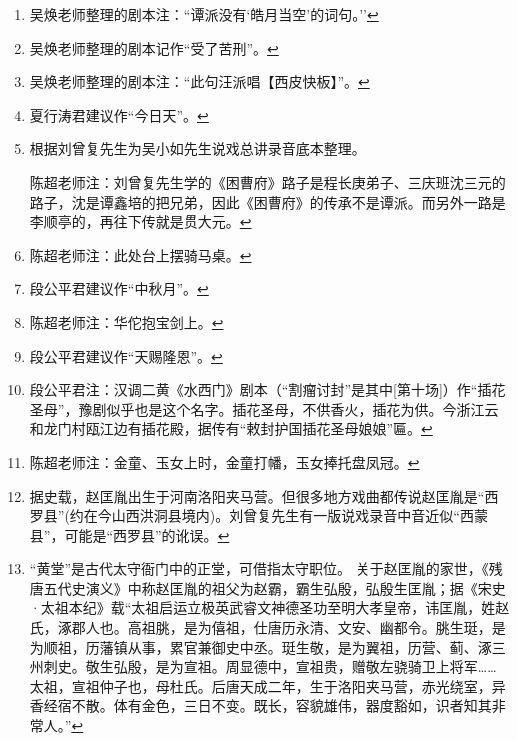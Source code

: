 \begin{enumerate}
\item
  \leavevmode\hypertarget{fn409}{}%
  吴焕老师整理的剧本注：``谭派没有`皓月当空'的词句。''\protect\hyperlink{fnref409}{↩}
\item
  \leavevmode\hypertarget{fn410}{}%
  吴焕老师整理的剧本记作``受了苦刑''。\protect\hyperlink{fnref410}{↩}
\item
  \leavevmode\hypertarget{fn411}{}%
  吴焕老师整理的剧本注：``此句汪派唱【西皮快板】''。\protect\hyperlink{fnref411}{↩}
\item
  \leavevmode\hypertarget{fn412}{}%
  夏行涛君建议作``今日天''。\protect\hyperlink{fnref412}{↩}
\item
  \leavevmode\hypertarget{fn413}{}%
  根据刘曾复先生为吴小如先生说戏总讲录音底本整理。

  陈超老师注：刘曾复先生学的《困曹府》路子是程长庚弟子、三庆班沈三元的路子，沈是谭鑫培的把兄弟，因此《困曹府》的传承不是谭派。而另外一路是李顺亭的，再往下传就是贯大元。\protect\hyperlink{fnref413}{↩}
\item
  \leavevmode\hypertarget{fn414}{}%
  陈超老师注：此处台上摆骑马桌。\protect\hyperlink{fnref414}{↩}
\item
  \leavevmode\hypertarget{fn415}{}%
  段公平君建议作``中秋月''。\protect\hyperlink{fnref415}{↩}
\item
  \leavevmode\hypertarget{fn416}{}%
  陈超老师注：华佗抱宝剑上。\protect\hyperlink{fnref416}{↩}
\item
  \leavevmode\hypertarget{fn417}{}%
  段公平君建议作``天赐隆恩''。\protect\hyperlink{fnref417}{↩}
\item
  \leavevmode\hypertarget{fn418}{}%
  段公平君注：汉调二黄《水西门》剧本（``割瘤讨封''是其中{[}第十场{]}）作``插花圣母''，豫剧似乎也是这个名字。插花圣母，不供香火，插花为供。今浙江云和龙门村瓯江边有插花殿，据传有``敕封护国插花圣母娘娘''匾。\protect\hyperlink{fnref418}{↩}
\item
  \leavevmode\hypertarget{fn419}{}%
  陈超老师注：金童、玉女上时，金童打幡，玉女捧托盘凤冠。\protect\hyperlink{fnref419}{↩}
\item
  \leavevmode\hypertarget{fn420}{}%
  据史载，赵匡胤出生于河南洛阳夹马营。但很多地方戏曲都传说赵匡胤是``西罗县''(约在今山西洪洞县境内)。刘曾复先生有一版说戏录音中音近似``西蒙县''，可能是``西罗县''的讹误。\protect\hyperlink{fnref420}{↩}
\item
  \leavevmode\hypertarget{fn421}{}%
  ``黄堂''是古代太守衙门中的正堂，可借指太守职位。
  关于赵匡胤的家世，《残唐五代史演义》中称赵匡胤的祖父为赵霸，霸生弘殷，弘殷生匡胤；据《宋史·太祖本纪》载``太祖启运立极英武睿文神德圣功至明大孝皇帝，讳匡胤，姓赵氏，涿郡人也。高祖朓，是为僖祖，仕唐历永清、文安、幽都令。朓生珽，是为顺祖，历藩镇从事，累官兼御史中丞。珽生敬，是为翼祖，历营、蓟、涿三州刺史。敬生弘殷，是为宣祖。周显德中，宣祖贵，赠敬左骁骑卫上将军\ldots{}\ldots{}太祖，宣祖仲子也，母杜氏。后唐天成二年，生于洛阳夹马营，赤光绕室，异香经宿不散。体有金色，三日不变。既长，容貌雄伟，器度豁如，识者知其非常人。''\protect\hyperlink{fnref421}{↩}

\end{enumerate}

